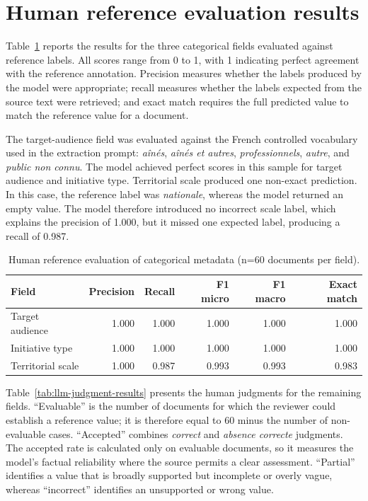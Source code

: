\documentclass[
11pt,
english,
singlespacing,
headsepline,
]{MastersDoctoralThesis}
\begin{document}
\section{Human reference evaluation results}

Table~\ref{tab:llm-categorical-results} reports the results for the three
categorical fields evaluated against reference labels. All scores range from 0 to 1, with 1 indicating
perfect agreement with the reference annotation. Precision measures whether the
labels produced by the model were appropriate; recall measures whether the labels
expected from the source text were retrieved; and exact match requires the full
predicted value to match the reference value for a document.

The target-audience field was evaluated against the French controlled vocabulary
used in the extraction prompt: \textit{aînés}, \textit{aînés et autres},
\textit{professionnels}, \textit{autre}, and \textit{public non connu}. The model
achieved perfect scores in this sample for target audience and initiative type.
Territorial scale produced one non-exact prediction. In this case, the reference
label was \textit{nationale}, whereas the model returned an empty value. The model
therefore introduced no incorrect scale label, which explains the
precision of 1.000, but it missed one expected label, producing a recall of 0.987.

\begin{table}[H]
\centering
\begin{tabular}{lrrrrr}
\toprule
Field & Precision & Recall & F1 micro & F1 macro & Exact match \\
\midrule
Target audience & 1.000 & 1.000 & 1.000 & 1.000 & 1.000 \\
Initiative type & 1.000 & 1.000 & 1.000 & 1.000 & 1.000 \\
Territorial scale & 1.000 & 0.987 & 0.993 & 0.993 & 0.983 \\
\bottomrule
\end{tabular}
\caption{Human reference evaluation of categorical metadata
(n=60 documents per field).}
\label{tab:llm-categorical-results}
\end{table}

Table~\ref{tab:llm-judgment-results} presents the human judgments for the
remaining fields. ``Evaluable'' is the number of documents for which the reviewer
could establish a reference value; it is therefore equal to 60 minus the number of
non-evaluable cases. ``Accepted'' combines \textit{correct} and \textit{absence
correcte} judgments. The accepted rate is calculated only on evaluable documents,
so it measures the model's factual reliability where the source permits a clear
assessment. ``Partial'' identifies a value that is broadly supported but incomplete
or overly vague, whereas ``incorrect'' identifies an unsupported or wrong value.
\end{document}
